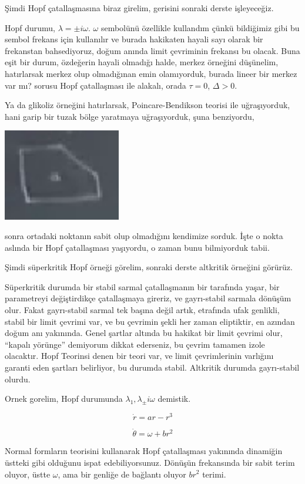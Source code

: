 \documentclass[12pt,fleqn]{article}\usepackage{../../common}
\begin{document}
Şimdi Hopf çatallaşmasına biraz girelim, gerisini sonraki derste işleyeceğiz.

Hopf durumu, $\lambda = \pm i\omega$. $\omega$ sembolünü özellikle kullandım
çünkü bildiğimiz gibi bu sembol frekans için kullanılır ve burada hakikaten
hayali sayı olarak bir frekanstan bahsediyoruz, doğum anında limit çevriminin
frekansı bu olacak. Buna eşit bir durum, özdeğerin hayali olmadığı halde, merkez
örneğini düşünelim, hatırlarsak merkez olup olmadığınan emin olamıyorduk, burada
lineer bir merkez var mı? sorusu Hopf çatallaşması ile alakalı, orada $\tau =
0$, $\Delta > 0$.

Ya da glikoliz örneğini hatırlarsak, Poincare-Bendikson teorisi ile
uğraşıyorduk, hani garip bir tuzak bölge yaratmaya uğraşıyorduk, şuna
benziyordu,

\includegraphics[height=4cm]{12_21.png}

sonra ortadaki noktanın sabit olup olmadığını kendimize sorduk. İşte o nokta
aslında bir Hopf çatallaşması yaşıyordu, o zaman bunu bilmiyorduk tabii. 

Şimdi süperkritik Hopf örneği görelim, sonraki derste altkritik örneğini
görürüz.

Süperkritik durumda bir stabil sarmal çatallaşmanın bir tarafında yaşar, bir
parametreyi değiştirdikçe çatallaşmaya gireriz, ve gayrı-stabil sarmala dönüşüm
olur. Fakat gayrı-stabil sarmal tek başına değil artık, etrafında ufak genlikli,
stabil bir limit çevrimi var, ve bu çevrimin şekli her zaman eliptiktir, en
azından doğum anı yakınında. Genel şartlar altında bu hakikat bir limit çevrimi
olur, ``kapalı yörünge'' demiyorum dikkat ederseniz, bu çevrim tamamen izole
olacaktır. Hopf Teorinsi denen bir teori var, ve limit çevrimlerinin varlığını
garanti eden şartları belirliyor, bu durumda stabil. Altkritik durumda
gayrı-stabil olurdu. 

Ornek gorelim, Hopf durumunda $\lambda_1,\lambda_ \pm i\omega$ demistik.

$$ \dot{r} = ar - r^3 $$

$$ \dot{\theta} = \omega + br^2 $$

Normal formların teorisini kullanarak Hopf çatallaşması yakınında dinamiğin
üstteki gibi olduğunu ispat edebiliyorsunuz. Dönüşün frekansında bir sabit terim
oluyor, üstte $\omega$, ama bir genliğe de bağlantı oluyor $br^2$ terimi.
\end{document}
